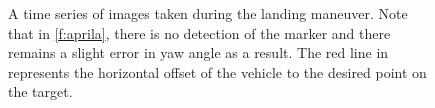 \begin{figure}
\begin{subfigmatrix}{4}
    \end{subfigmatrix}
    \caption{A time series of images taken during the landing maneuver. Note that in \cref{f:aprila}, there is
    no detection of the marker and there remains a slight error in yaw angle as a result. The red line in
 represents the horizontal offset of the vehicle to the desired point on the target.}
    \label{f:landing_ims}
\end{figure}

